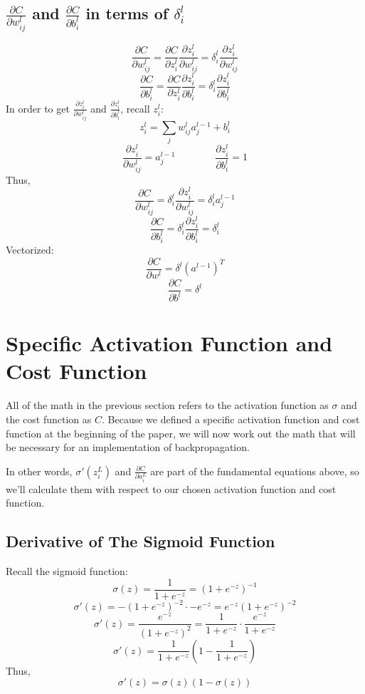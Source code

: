 \documentclass[11pt]{article}
\begin{document}
\subsection{$\frac{\partial C}{\partial w_{ij}^l}$ and $\frac{\partial C}{\partial b_i^l}$ in terms of $\delta_i^l$}

\[\frac{\partial C}{\partial w_{ij}^l} = \frac{\partial C}{\partial z_i^l} \frac{\partial z_i^l}{\partial w_{ij}^l} = \delta_i^l \frac{\partial z_i^l}{\partial w_{ij}^l}\]
\[\frac{\partial C}{\partial b_i^l} = \frac{\partial C}{\partial z_i^l} \frac{\partial z_i^l}{\partial b_i^l} = \delta_i^l \frac{\partial z_i^l}{\partial b_i^l}\]
In order to get $\frac{\partial z_i^l}{\partial w_{ij}^l}$ and $\frac{\partial z_i^l}{\partial b_i^l}$, recall $z_i^l$:
\[z_i^l = \sum_j w_{ij}^l a_j^{l - 1} + b_i^l\]
\[\frac{\partial z_i^l}{\partial w_{ij}^l} = a_j^{l - 1}
\qquad \qquad 
\frac{\partial z_i^l}{\partial b_i^l} = 1\]
Thus,
\[\frac{\partial C}{\partial w_{ij}^l} = \delta_i^l \frac{\partial z_i^l}{\partial w_{ij}^l} = \delta_i^l a_j^{l - 1}\]
\[\frac{\partial C}{\partial b_i^l} = \delta_i^l \frac{\partial z_i^l}{\partial b_i^l} = \delta_i^l\]
Vectorized:
\[\frac{\partial C}{\partial w^l} = \delta^l \left(a^{l - 1}\right)^T\]
\[\frac{\partial C}{\partial b^l} = \delta^l\]

\section{Specific Activation Function and Cost Function}

All of the math in the previous section refers to the activation function as $\sigma$ and the cost function as $C$. Because we defined a specific activation function and cost function at the beginning of the paper, we will now work out the math that will be necessary for an implementation of backpropagation.

In other words, $\sigma'(z_i^L)$ and $\frac{\partial C}{\partial a_i^L}$ are part of the fundamental equations above, so we'll calculate them with respect to our chosen activation function and cost function.

\subsection{Derivative of The Sigmoid Function}
Recall the sigmoid function:
\[\sigma(z) = \frac{1}{1 + e^{-z}} = \left(1 + e^{-z}\right)^{-1}\]
\[\sigma'(z) = -\left(1 + e^{-z}\right)^{-2} \cdot -e^{-z} = e^{-z} \left(1 + e^{-z}\right)^{-2}\]
\[\sigma'(z) = \frac{e^{-z}}{\left(1 + e^{-z}\right)^{2}} = \frac{1}{1 + e^{-z}} \cdot \frac{e^{-z}}{1 + e^{-z}}\]
\[\sigma'(z) = \frac{1}{1 + e^{-z}} \left(1 - \frac{1}{1 + e^{-z}}\right)\]
Thus,
\[\sigma'(z) = \sigma(z) \left(1 - \sigma(z)\right)\]
\end{document}
